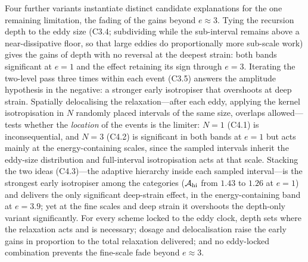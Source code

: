 \documentclass{JFM-FLM_Au}
\begin{document}
Four further variants instantiate distinct candidate explanations for
the one remaining limitation, the fading of the gains beyond
$e\approx3$. Tying the recursion depth to the eddy size (C3.4;
subdividing while the sub-interval remains above a near-dissipative
floor, so that large eddies do proportionally more sub-scale work)
gives the gains of depth with no reversal at the deepest strain: both
bands significant at $e=1$ and the effect retaining its sign through
$e=3$. Iterating the two-level pass three times within each event
(C3.5) answers the amplitude hypothesis in the negative: a stronger
early isotropiser that overshoots at deep strain. Spatially
delocalising the relaxation---after each eddy, applying the kernel
isotropisation in $N$ randomly placed intervals of the same size,
overlaps allowed---tests whether the \emph{location} of the events is
the limiter: $N=1$ (C4.1) is inconsequential, and $N=3$ (C4.2) is
significant in both bands at $e=1$ but acts mainly at the
energy-containing scales, since the sampled intervals inherit the
eddy-size distribution and full-interval isotropisation acts at that
scale. Stacking the two ideas (C4.3)---the adaptive hierarchy inside
each sampled interval---is the strongest early isotropiser among the
categories ($\mathcal A_{\rm hi}$ from $1.43$ to $1.26$ at $e=1$) and
delivers the only significant deep-strain effect, in the
energy-containing band at $e=3.9$; yet at the fine scales and deep
strain it overshoots the depth-only variant significantly. For every
scheme locked to the eddy clock, depth sets where the relaxation acts
and is necessary; dosage and delocalisation raise the early gains in
proportion to the total relaxation delivered; and no eddy-locked
combination prevents the fine-scale fade beyond $e\approx3$.
\end{document}
